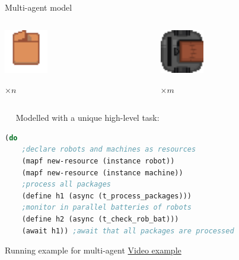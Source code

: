 \begin{frame}[fragile]{Multi-agent model}
    \begin{columns}
        \begin{column}{0.5\textwidth}
            \centering
            \includegraphics[width = 0.3\textwidth]{images/godot/package.png}
            
            \Large $\times n$
        \end{column}
        \begin{column}{0.5\textwidth}
            \centering
            \includegraphics[width = 0.3\textwidth]{images/godot/robot_texture.png}
            
            \LARGE $\times m$
        \end{column}
    \end{columns}
\pause
~~
\centering
        Modelled with a unique high-level task:
        \setlength{\leftmargini}{0pt}
        \lstset{columns=fullflexible}
        \small
    \begin{lstlisting}[language = lisp]
(do
    ;declare robots and machines as resources
    (mapf new-resource (instance robot))
    (mapf new-resource (instance machine))
    ;process all packages
    (define h1 (async (t_process_packages)))
    ;monitor in parallel batteries of robots
    (define h2 (async (t_check_rob_bat)))
    (await h1)) ;await that all packages are processed
    \end{lstlisting}    
\end{frame}

\begin{frame}{Running example for multi-agent}
    \centering
    \LARGE
    \href{https://youtu.be/KqBnKKIjug4}{Video example}
\end{frame}

